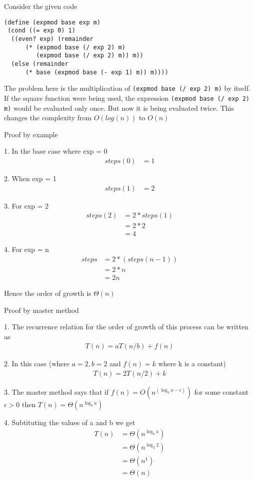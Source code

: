 \documentclass[a4paper,12pt]{article}
\begin{document}
\noindent Consider the given code

\lstset{
language=Lisp,                            
basicstyle=\ttfamily,  
}

\begin{lstlisting}
(define (expmod base exp m)
 (cond ((= exp 0) 1)
  ((even? exp) (remainder 
      (* (expmod base (/ exp 2) m)
         (expmod base (/ exp 2) m)) m))
  (else (remainder 
      (* base (expmod base (- exp 1) m)) m))))
\end{lstlisting}

\bigskip\noindent The problem here is the multiplication of \texttt{(expmod base (/ exp 2) m)} by itself.
If the square function were being used, the expression \texttt{(expmod base (/ exp 2) m)}
would be evaluated only once. But now it is being evaluated twice. This changes
the complexity from $O(log(n))$ to $O(n)$

\bigskip\noindent Proof by example

1. In the base case where exp = 0
\begin{align}
steps(0) &= 1 
\end{align}

2. When exp = 1
\begin{align}
steps(1) &= 2
\end{align}

3. For exp = 2
\begin{align}
steps(2) &= 2 * steps(1) \\
& = 2 * 2 \\
& = 4
\end{align}
                  
4. For exp = n
\begin{align}
steps &= 2 * (steps(n-1)) \\
& = 2 * n \\
& = 2n
\end{align}

Hence the order of growth is $\Theta(n)$

\bigskip\noindent Proof by master method

1. The recurrence relation for the order of growth of this process can be
written as
\begin{align}T(n) = aT(n/b) + f(n)\end{align}

2. In this case (where $a=2, b=2$ and $f(n)=k$ where k is a constant)
\begin{align}T(n) = 2T(n/2) + k\end{align}

3. The master method says that if
               $f(n) = O(n^{(\log_b{a}-\epsilon)})$ for some constant $\epsilon > 0$ then
               $T(n) = \Theta(n^{\log_b{a}})$
               
4. Subtituting the values of a and b we get
\begin{align}
T(n) &= \Theta(n^{\log_b{a}}) \\
& = \Theta(n^{\log_2{2}}) \\
& = \Theta(n^1) \\
& = \Theta(n)
\end{align}
\end{document}
